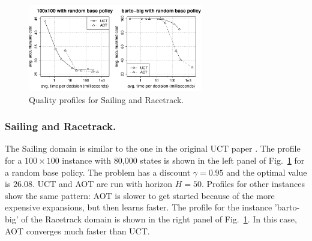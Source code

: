 \documentclass[letterpaper]{article}
\newcommand{\Omit}[1]{}
\begin{document}
\begin{figure}
\centering
\includegraphics[width=3in,clip=on,trim=.75cm 1cm 1.5cm 1cm]{combined.pdf}
\caption{Quality profiles for Sailing and Racetrack.}
\label{fig:combined}
\end{figure}

\subsubsection{Sailing and Racetrack.} The Sailing domain is  similar to the one %
in the original  UCT paper \cite{uct}. The profile for a $100\times 100$ instance with 
80,000 states  is shown in the left panel of Fig.~\ref{fig:combined} for a random base
policy.
The problem has a discount $\gamma=0.95$ and the optimal value is $26.08$.
UCT and AOT are run with horizon $H=50$.
Profiles for other instances show the same pattern: AOT is slower
to get started because of the more expensive expansions, but then learns
faster.
The profile for the instance 'barto-big' of the Racetrack domain
\cite{barto:rtdp} is shown in the right panel of Fig.~\ref{fig:combined}.
In this case, AOT converges %
much faster than UCT.

\Omit{
.  The results are shown  in Fig.~\ref{fig:race:tradeoff}
for one of the standard instances. UCT was run for 10, 50, 100, 500, 1k, 5k, 10k iterations,
while AOT for 10, 50, 100, 500, 1k iterations. 
The problem is undiscounted and $H$ is $50$. The same 
base policies have been used. The problem has optimal value
of $26.13430$ and the  number of states is 22,534 states.}
\end{document}
